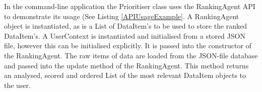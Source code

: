 In the command-line application the Prioritiser class uses the RankingAgent API to demonstrate its usage (See Listing \ref{APIUsageExample}. A RankingAgent object is instantiated, as is a List of DataItem's to be used to store the ranked DataItem's. A UserContext is instantiated and initialised from a stored JSON file, however this can be initialised explicitly. It is passed into the constructor of the RankingAgent. The raw items of data are loaded from the JSON-file database and passed into the update method of the RankingAgent. This method returns an analysed, scored and ordered List of the most relevant DataItem objects to the user. 


